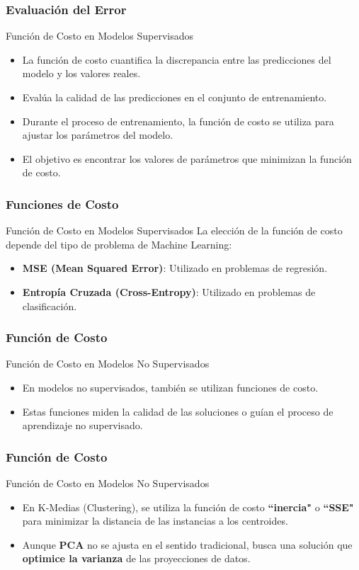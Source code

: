 \documentclass{beamer}
\begin{document}
\begin{frame}
	\frametitle{Evaluación del Error}
		\begin{block}{Función de Costo en Modelos Supervisados}	
	\begin{itemize}
		\item La función de costo cuantifica la discrepancia entre las predicciones del modelo y los valores reales.
		\item Evalúa la calidad de las predicciones en el conjunto de entrenamiento.
				\item Durante el proceso de entrenamiento, la función de costo se utiliza para ajustar los parámetros del modelo.
		\item El objetivo es encontrar los valores de parámetros que minimizan la función de costo.
	\end{itemize}
		\end{block}
\end{frame}




\begin{frame}
	\frametitle{Funciones de Costo}
			\begin{block}{Función de Costo en Modelos Supervisados}	
				La elección de la función de costo depende del tipo de problema de Machine Learning:
	\begin{itemize}
		\item \textbf{MSE (Mean Squared Error)}: Utilizado en problemas de regresión.
		\item \textbf{Entropía Cruzada (Cross-Entropy)}: Utilizado en problemas de clasificación.
	\end{itemize}
	\end{block}
\end{frame}

\begin{frame}
	\frametitle{Función de Costo}
			\begin{block}{Función de Costo en Modelos No Supervisados}	
	\begin{itemize}
		\item En modelos no supervisados, también se utilizan funciones de costo.
		\item Estas funciones miden la calidad de las soluciones o guían el proceso de aprendizaje no supervisado.
	\end{itemize}
		\end{block}
\end{frame}

\begin{frame}
	\frametitle{Función de Costo}
		\begin{block}{Función de Costo en Modelos No Supervisados}	
	\begin{itemize}
		\item En K-Medias (Clustering), se utiliza la función de costo \textbf{``inercia"} o \textbf{``SSE"} para minimizar la distancia de las instancias a los centroides.
			\item Aunque \textbf{PCA} no se ajusta en el sentido tradicional, busca una solución que\textbf{ optimice la varianza }de las proyecciones de datos.
	\end{itemize}
	\end{block}
\end{frame}
\end{document}
